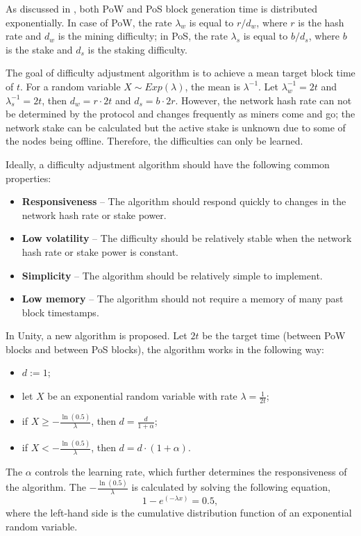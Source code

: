 \documentclass[a4paper]{article}
\begin{document}
As discussed in \cite{bitfury2015}, both PoW and PoS block generation time is distributed exponentially. In case of PoW, the rate $\lambda_w$ is equal to $r/d_w$, where $r$ is the hash rate and $d_w$ is the mining difficulty; in PoS, the rate $\lambda_s$ is equal to $b/d_s$, where $b$ is the stake and $d_s$ is the staking difficulty.

The goal of difficulty adjustment algorithm is to achieve a mean target block time of $t$. For a random variable $X \sim Exp(\lambda)$, the mean is $\lambda^{-1}$. Let $\lambda_w^{-1} = 2t$ and $\lambda_s^{-1} = 2t$, then $d_w = r \cdot 2t$ and $d_s = b \cdot 2r$. However, the network hash rate can not be determined by the protocol and changes frequently as miners come and go; the network stake can be calculated but the active stake is unknown due to some of the nodes being offline. Therefore, the difficulties can only be learned.

Ideally, a difficulty adjustment algorithm should have the following common properties:
\begin{itemize}
    \item \textbf{Responsiveness} -- The algorithm should respond quickly to changes in the network hash rate or stake power.
    \item \textbf{Low volatility} -- The difficulty should be relatively stable when the network hash rate or stake power is constant. 
    \item \textbf{Simplicity} -- The algorithm should be relatively simple to implement.
    \item \textbf{Low memory} -- The algorithm should not require a memory of many past block timestamps.
\end{itemize}

In Unity, a new algorithm is proposed. Let $2t$ be the target time (between PoW blocks and between PoS blocks), the algorithm works in the following way:
\begin{itemize}
    \item $d := 1$;
    \item let $X$ be an exponential random variable with rate $\lambda = \frac{1}{2t}$;
    \item if $X \geq -\frac{\ln (0.5)}{\lambda}$, then $d = \frac{d}{1 + \alpha}$;
    \item if $X < -\frac{\ln (0.5)}{\lambda}$, then $d = d \cdot (1 + \alpha)$.
\end{itemize}
The $\alpha$ controls the learning rate, which further determines the responsiveness of the algorithm. The $-\frac{\ln (0.5)}{\lambda}$ is calculated by solving the following equation,
\begin{equation}
    1-e^{(-\lambda x)}=0.5,
\end{equation}
where the left-hand side is the cumulative distribution function of an exponential random variable.
\end{document}
